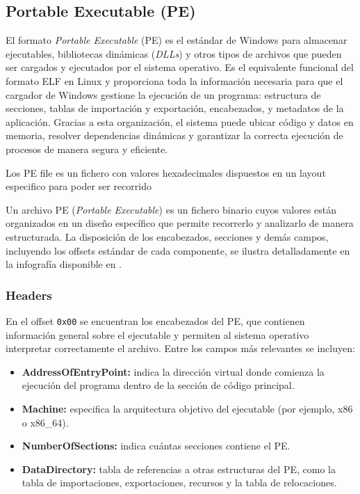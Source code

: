 \subsection{Portable Executable (PE)}

El formato \textit{Portable Executable} (PE) es el estándar de Windows para almacenar ejecutables, bibliotecas dinámicas (\textit{DLLs}) y otros tipos de archivos que pueden ser cargados y ejecutados por el sistema operativo.  
Es el equivalente funcional del formato ELF en Linux y proporciona toda la información necesaria para que el cargador de Windows gestione la ejecución de un programa: estructura de secciones, tablas de importación y exportación, encabezados, y metadatos de la aplicación.  
Gracias a esta organización, el sistema puede ubicar código y datos en memoria, resolver dependencias dinámicas y garantizar la correcta ejecución de procesos de manera segura y eficiente.

Los PE file es un fichero con valores hexadecimales dispuestos en un layout especifico para poder ser recorrido

Un archivo PE (\textit{Portable Executable}) es un fichero binario cuyos valores están organizados en un diseño específico que permite recorrerlo y analizarlo de manera estructurada.  
La disposición de los encabezados, secciones y demás campos, incluyendo los offsets estándar de cada componente, se ilustra detalladamente en la infografía disponible en \cite{peinfografia}.

\subsubsection{Headers}

En el offset \texttt{0x00} se encuentran los encabezados del PE, que contienen información general sobre el ejecutable y permiten al sistema operativo interpretar correctamente el archivo. Entre los campos más relevantes se incluyen:

\begin{itemize}
    \item \textbf{AddressOfEntryPoint:} indica la dirección virtual donde comienza la ejecución del programa dentro de la sección de código principal.
    \item \textbf{Machine:} especifica la arquitectura objetivo del ejecutable (por ejemplo, x86 o x86\_64).
    \item \textbf{NumberOfSections:} indica cuántas secciones contiene el PE.
    \item \textbf{DataDirectory:} tabla de referencias a otras estructuras del PE, como la tabla de importaciones, exportaciones, recursos y la tabla de relocaciones.
\end{itemize}

